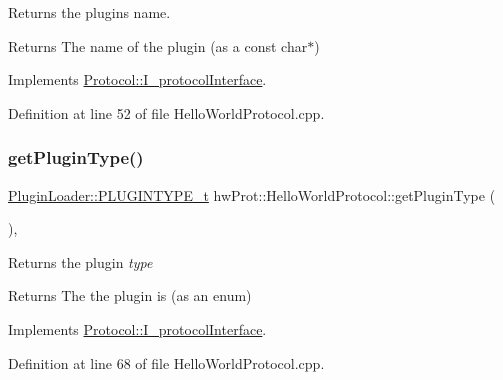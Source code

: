 Returns the plugins name. 

\begin{DoxyReturn}{Returns}
The name of the plugin (as a const char$\ast$) 
\end{DoxyReturn}


Implements \mbox{\hyperlink{classProtocol_1_1I__protocolInterface_a53e95b7d9ea9ad8ee179c2663511ce20}{Protocol\+::\+I\+\_\+protocol\+Interface}}.



Definition at line 52 of file Hello\+World\+Protocol.\+cpp.

\mbox{\label{classhwProt_1_1HelloWorldProtocol_aa3a9c97bcf934fa61cd69e19b93a2689}} 
\subsubsection{\texorpdfstring{getPluginType()}{getPluginType()}}
{\footnotesize\ttfamily \mbox{\hyperlink{namespacePluginLoader_a7b1358e9577b47b5d4b16231a5a81699}{Plugin\+Loader\+::\+P\+L\+U\+G\+I\+N\+T\+Y\+P\+E\+\_\+t}} hw\+Prot\+::\+Hello\+World\+Protocol\+::get\+Plugin\+Type (\begin{DoxyParamCaption}{ }\end{DoxyParamCaption})\hspace{0.3cm}{\ttfamily [override]}, {\ttfamily [virtual]}}



Returns the plugin {\itshape type} 

\begin{DoxyReturn}{Returns}
The the plugin is (as an enum) 
\end{DoxyReturn}


Implements \mbox{\hyperlink{classProtocol_1_1I__protocolInterface_aaa1010c6c48d6a4a99998ae383f2172c}{Protocol\+::\+I\+\_\+protocol\+Interface}}.



Definition at line 68 of file Hello\+World\+Protocol.\+cpp.

\mbox{\label{classhwProt_1_1HelloWorldProtocol_ab4c559084de5fa090d75672eff462841}} 
